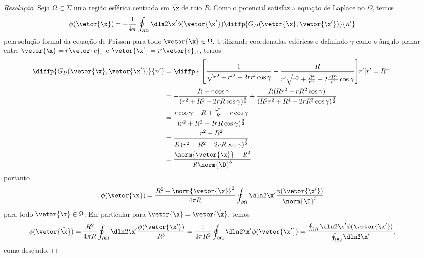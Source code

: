 \begin{proof}[Resolução]
    Seja \(\Omega \subset \Sigma\) uma região esférica centrada em \(\tilde{\x}\) de raio \(R\). Como o potencial satisfaz a equação de Laplace no \(\Omega\), temos
    \begin{equation*}
        \phi(\vetor{\x}) = - \frac1{4\pi} \oint_{\partial \Omega} \dln2{\x'} \phi(\vetor{\x'}) \diffp{G_D(\vetor{\x}, \vetor{\x'})}{n'}
    \end{equation*}
    pela solução formal da equação de Poisson para todo \(\vetor{\x} \in \Omega\). Utilizando coordenadas esféricas e definindo \(\gamma\) como o ângulo planar entre \(\vetor{\x} = r \vetor{e}_r\) e \(\vetor{\x'} = r' \vetor{e}_{r'}\), temos
    \begin{align*}
        \diffp{G_D(\vetor{\x}, \vetor{\x'})}{n'}
        &= \diffp*{\left[\frac{1}{\sqrt{r^2 + r'^2 - 2r r' \cos \gamma}}-\frac{R}{r'\sqrt{r^2 + \frac{R^4}{r'^2} - 2\frac{rR^2}{r'}\cos \gamma}}\right]}{r'}[r'=R^-]\\
        &= -\frac{R - r\cos \gamma}{(r^2 + R^2 - 2r R \cos \gamma)^{\frac32}} + \frac{R(Rr^2 - rR^2 \cos \gamma)}{(R^2r^2 + R^4 - 2rR^3 \cos \gamma)^{\frac32}}\\
        &= \frac{r \cos \gamma - R + \frac{r^2}{R} - r\cos \gamma}{(r^2 + R^2 - 2rR \cos \gamma)^{\frac32}}\\
        &= \frac{r^2 - R^2}{R\left(r^2 + R^2 - 2rR \cos \gamma\right)^{\frac32}}\\
        &= \frac{\norm{\vetor{\x}} - R^2}{R\norm{\D}^3}
    \end{align*}
    portanto
    \begin{equation*}
        \phi(\vetor{\x}) = \frac{R^2 - \norm{\vetor{\x}}^2}{4\pi R} \oint_{\partial \Omega} \dln2{\x'} \frac{\phi(\vetor{\x'})}{\norm{\D}^3}
    \end{equation*}
    para todo \(\vetor{\x} \in \Omega\). Em particular para \(\vetor{\x} = \vetor{\tilde{\x}}\), temos
    \begin{equation*}
        \phi(\vetor{\tilde{\x}}) = \frac{R^2}{4\pi R} \oint_{\partial\Omega} \dln2{\x'}\frac{\phi(\vetor{\x'})}{R^3} = \frac{1}{4\pi R^2}\oint_{\partial\Omega} \dln2{\x'} \phi(\vetor{\x'}) = \frac{\oint_{\partial\Omega} \dln2{\x'} \phi(\vetor{\x'})}{\oint_{\partial\Omega} \dln2{\x'}},
    \end{equation*}
    como desejado.
\end{proof}
